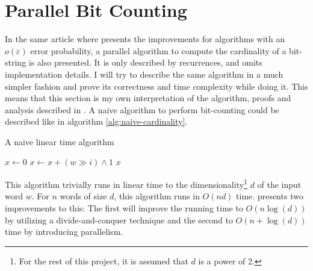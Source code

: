 \section{Parallel Bit Counting}
In the same article where \citet{fast-similarity-search} presents the improvements for algorithms with an $o(\varepsilon)$ error probability, a parallel algorithm to compute the cardinality of a bit-string is also presented. It is only described by recurrences, and omits implementation details. I will try to describe the same algorithm in a much simpler fashion and prove its correctness and time complexity while doing it. This means that this section is my own interpretation of the algorithm, proofs and analysis described in \cite{fast-similarity-search}.
A naive algorithm to perform bit-counting could be described like in algorithm \ref{alg:naive-cardinality}.
\begin{algorithm}[H]
\caption{A naive linear time algorithm}\label{alg:naive-cardinality}
\begin{algorithmic}[1]
 
\State $x \gets 0$
\State $x \gets x + (w \gg i) \land 1$
\EndFor
\State \Return $x$
\EndFunction
\end{algorithmic}
\end{algorithm}
This algorithm trivially runs in linear time to the dimensionality\footnote{For the rest of this project, it is assumed that $d$ is a power of 2.} $d$ of the input word $w$. For $n$ words of size $d$, this algorithm runs in $O(nd)$ time.
\citet{fast-similarity-search} presents two improvements to this: The first will improve the running time to $O(n\log(d))$ by utilizing a divide-and-conquer technique and the second to $O(n + \log(d))$ time by introducing parallelism.
